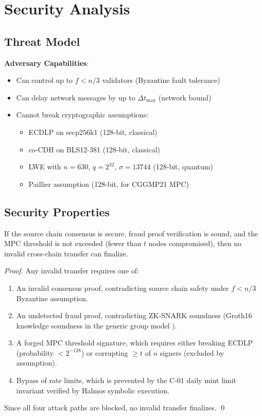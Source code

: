 \section{Security Analysis}


\subsection{Threat Model}

\textbf{Adversary Capabilities}:
\begin{itemize}[leftmargin=1.1em]
  \item Can control up to $f < n/3$ validators (Byzantine fault tolerance)
  \item Can delay network messages by up to $\Delta t_{\text{max}}$ (network bound)
  \item Cannot break cryptographic assumptions:
  \begin{itemize}
    \item ECDLP on secp256k1 (128-bit, classical)
    \item co-CDH on BLS12-381 (128-bit, classical)
    \item LWE with $n = 630$, $q = 2^{32}$, $\sigma = 13744$ (128-bit, quantum)
    \item Paillier assumption (128-bit, for CGGMP21 MPC)
  \end{itemize}
\end{itemize}

\subsection{Security Properties}

\begin{theorem}
If the source chain consensus is secure, fraud proof verification is sound, and the MPC threshold is not exceeded (fewer than $t$ nodes compromised), then no invalid cross-chain transfer can finalize.
\end{theorem}

\begin{proof}
Any invalid transfer requires one of:
\begin{enumerate}
  \item An invalid consensus proof, contradicting source chain safety under $f < n/3$ Byzantine assumption.
  \item An undetected fraud proof, contradicting ZK-SNARK soundness (Groth16 knowledge soundness in the generic group model \cite{groth2016size}).
  \item A forged MPC threshold signature, which requires either breaking ECDLP (probability $< 2^{-128}$) or corrupting $\geq t$ of $n$ signers (excluded by assumption).
  \item Bypass of rate limits, which is prevented by the C-01 daily mint limit invariant verified by Halmos symbolic execution.
\end{enumerate}
Since all four attack paths are blocked, no invalid transfer finalizes. \qed
\end{proof}

